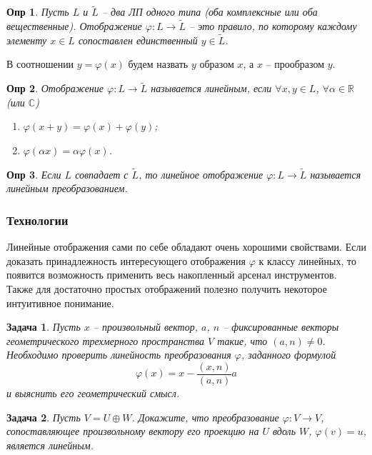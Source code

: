 \documentclass[a4paper,12pt]{article}
\newtheorem*{definition}{Опр}
\newtheorem*{prob}{Задача}
\begin{document}
\begin{definition}
	Пусть $L$ и $\tilde{L}$ -- два ЛП одного типа (оба комплексные или оба вещественные). Отображение $\varphi: L \to \tilde{L}$ -- это правило, по которому каждому элементу $x \in L$ сопоставлен единственный $y \in \tilde{L}$. 
\end{definition}

В соотношении $y = \varphi(x)$ будем назвать $y$ образом $x$, а $x$ -- прообразом $y$.

\begin{definition}
	Отображение $\varphi: L \to \tilde{L}$ называется линейным, если $\forall x,y \in L$, $\forall \alpha \in \mathbb{R}$ (или $\mathbb{C}$)
	\begin{enumerate}
		\item $\varphi(x+y) = \varphi(x) + \varphi(y)$;
		\item $\varphi(\alpha x) = \alpha \varphi(x)$.
	\end{enumerate}
\end{definition}

\begin{definition}
	Если $L$ совпадает с $\tilde{L}$, то линейное отображение $\varphi : L \to \tilde{L}$ называется линейным преобразованием.
\end{definition}

\subsubsection{Технологии}

Линейные отображения сами по себе обладают очень хорошими свойствами. Если доказать принадлежность интересующего отображения $\varphi$ к классу линейных, то появится возможность применить весь накопленный арсенал инструментов. Также для достаточно простых отображений полезно получить некоторое интуитивное понимание.

\begin{prob}
	Пусть $x$ -- произвольный вектор, $a$, $n$ -- фиксированные векторы геометрического трехмерного пространства $V$ такие, что $(a,n) \ne 0$. Необходимо проверить линейность преобразования $\varphi$, заданного формулой
	\[
		\varphi(x) = x - \dfrac{(x,n)}{(a,n)} a
	\]
	и выяснить его геометрический смысл.
\end{prob}

 \begin{prob}
 	Пусть $V = U \oplus W$. Докажите, что преобразование $\varphi: V \to V$, сопоставляющее произвольному вектору его проекцию на $U$ вдоль $W$, $\varphi(v) = u$, является линейным. 
 \end{prob}
\end{document}
